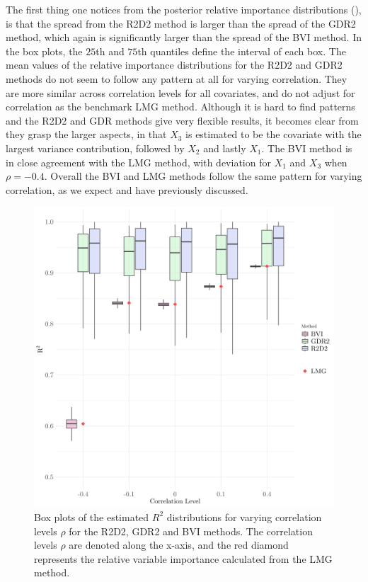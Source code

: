 \noindent The first thing one notices from the posterior relative importance distributions (), is that the spread from the R2D2 method is larger than the spread of the GDR2 method, which again is significantly larger than the spread of the BVI method. In the box plots, the $25$th and $75$th quantiles define the interval of each box. The mean values of the relative importance distributions for the R2D2 and GDR2 methods do not seem to follow any pattern at all for varying correlation. They are more similar across correlation levels for all covariates, and do not adjust for correlation as the benchmark LMG method. Although it is hard to find patterns and the R2D2 and GDR methods give very flexible results, it becomes clear from they grasp the larger aspects, in that $X_3$ is estimated to be the covariate with the largest variance contribution, followed by $X_2$ and lastly $X_1$. The BVI method is in close agreement with the LMG method, with deviation for $X_1$ and $X_3$ when $\rho=-0.4$. Overall the BVI and LMG methods follow the same pattern for varying correlation, as we expect and have previously discussed.
\begin{figure}[H]%
  \centering
  \includegraphics[width=1\linewidth]{Figures/R2D2_BVI_Comparison/R2D2_BVI_R2_plot.png}
  \caption[Comparison of the marginal $R^2$ from the BVI method and the shrinkage prior methods]{Box plots of the estimated $R^2$ distributions for varying correlation levels $\rho$ for the R2D2, GDR2 and BVI methods. The correlation levels $\rho$ are denoted along the x-axis, and the red diamond represents the relative variable importance calculated from the LMG method.}
  \label{fig:r2d2_r2}
\end{figure}
